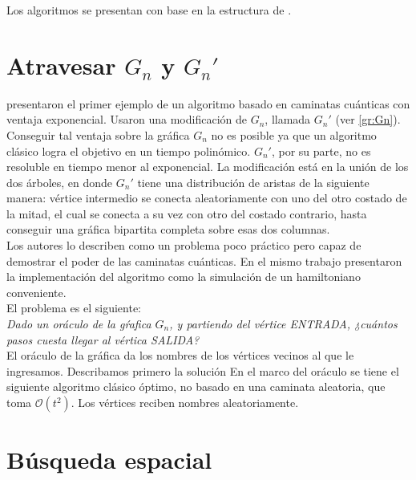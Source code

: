 Los algoritmos se presentan con base en la estructura de \cite{shao}.
\section{Atravesar $G_n$ y $G_n'$}
\cite{childs2003exponential} presentaron el primer ejemplo de un algoritmo basado en caminatas cuánticas con ventaja exponencial. Usaron una modificación de $G_n$, llamada $G_n'$ (ver \ref{gr:Gn}). Conseguir tal ventaja sobre la gráfica $G_n$ no es posible ya que un algoritmo clásico logra el objetivo en un tiempo polinómico. $G_n'$, por su parte, no es resoluble en tiempo menor al exponencial. La modificación está en la unión de los dos árboles, en donde $G_n'$ tiene una distribución de aristas de la siguiente manera: vértice intermedio se conecta aleatoriamente con uno del otro costado de la mitad, el cual se conecta a su vez con otro del costado contrario, hasta conseguir una gráfica bipartita completa sobre esas dos columnas. \\

Los autores lo describen como un problema poco práctico pero capaz de demostrar el poder de las caminatas cuánticas. En el mismo trabajo presentaron la implementación del algoritmo como la simulación de un hamiltoniano conveniente.\\ 

El problema es el siguiente:\\

\textit{Dado un oráculo de la gŕafica $G_n$, y partiendo del vértice ENTRADA, ¿cuántos pasos cuesta llegar al vértica SALIDA?}\\

El oráculo de la gráfica da los nombres de los vértices vecinos al que le ingresamos. Describamos primero la solución En el marco del oráculo se tiene el siguiente algoritmo clásico óptimo, no basado en una caminata aleatoria, que toma $\mathcal{O}(t^2)$. Los vértices reciben nombres aleatoriamente. 


\section{Búsqueda espacial}


